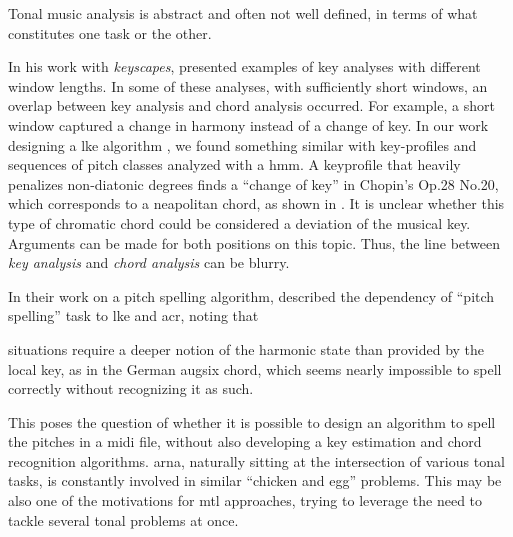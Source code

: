 

Tonal music analysis is abstract and often not well defined,
in terms of what constitutes one task or the other.


In his work with \emph{keyscapes},
\textcite{sapp2011computational} presented examples of key
analyses with different window lengths. In some of these
analyses, with sufficiently short windows, an overlap
between key analysis and chord analysis occurred. For
example, a short window captured a change in harmony instead
of a change of key. In our work designing a \gls{lke}
algorithm \parencite{napoleslopez2019keyfinding}, we found
something similar with key-profiles and sequences of pitch
classes analyzed with a \gls{hmm}. A \gls{keyprofile} that
heavily penalizes non-diatonic degrees finds a ``change of
key'' in Chopin's Op.28 No.20, which corresponds to a
\gls{neapolitan} chord, as shown in . It is
unclear whether this type of chromatic chord could be
considered a deviation of the musical key. Arguments can be
made for both positions on this topic. Thus, the line
between \emph{key analysis} and \emph{chord analysis} can be
blurry.



In their work on a pitch spelling algorithm,
\textcite{teodoru2007pitch} described the dependency of
``pitch spelling'' task to \gls{lke} and \gls{acr}, noting
that 

\begin{italicquotes}
 situations require a deeper notion of the
harmonic state than provided by the local key, as in the
German \gls{augsix} chord, which seems nearly impossible to
spell correctly without recognizing it as such.
\end{italicquotes}

This poses the question of whether it is possible to design
an algorithm to spell the pitches in a \gls{midi} file,
without also developing a key estimation and chord
recognition algorithms. \gls{arna}, naturally sitting at the
intersection of various tonal tasks, is constantly involved
in similar ``chicken and egg'' problems. This may be also
one of the motivations for \gls{mtl} approaches, trying to
leverage the need to tackle several tonal problems at once.
